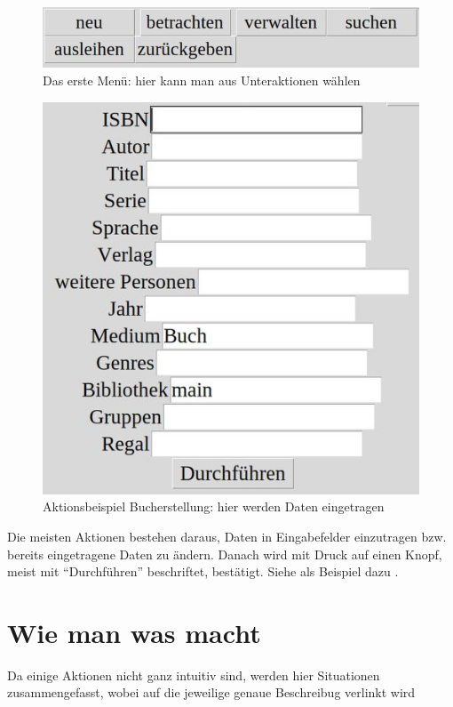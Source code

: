 \begin{figure}\includegraphics{images/gui2/initial_menu.jpg}\caption{Das erste Menü: hier kann man aus Unteraktionen wählen}\label{fig:initial_menu}\end{figure}
\begin{figure}\includegraphics{images/gui2/new_book.jpg}\caption{Aktionsbeispiel Bucherstellung: hier werden Daten eingetragen}\label{fig:new_book_example}\end{figure}

Die meisten Aktionen bestehen daraus, Daten in Eingabefelder einzutragen bzw. bereits eingetragene Daten zu ändern. Danach wird mit Druck auf einen Knopf, meist mit ``Durchführen'' beschriftet, bestätigt. Siehe als Beispiel dazu .

\section{Wie man was macht}
\label{sec:howto}
Da einige Aktionen nicht ganz intuitiv sind, werden hier Situationen zusammengefasst, wobei auf die jeweilige genaue Beschreibug verlinkt wird

